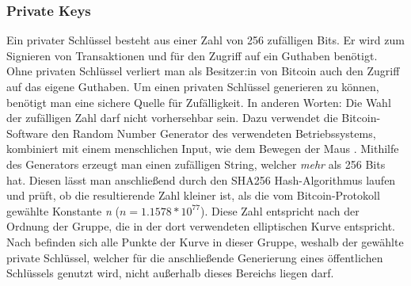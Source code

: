 \subsubsection{Private Keys}
Ein privater Schlüssel besteht aus einer Zahl von 256 zufälligen Bits. Er wird zum Signieren von Transaktionen und für den Zugriff auf ein Guthaben benötigt. Ohne privaten Schlüssel verliert man als Besitzer:in von Bitcoin auch den Zugriff auf das eigene Guthaben.
Um einen privaten Schlüssel generieren zu können, benötigt man eine sichere Quelle für Zufälligkeit. In anderen Worten: Die Wahl der zufälligen Zahl darf nicht vorhersehbar sein. Dazu verwendet die Bitcoin-Software den Random Number Generator des verwendeten Betriebssystems, kombiniert mit einem menschlichen Input, wie dem Bewegen der Maus \cite[S. 58]{antanopoulos_2014}. Mithilfe des Generators erzeugt man einen zufälligen String, welcher \emph{mehr} als 256 Bits hat. Diesen lässt man anschließend durch den SHA256 Hash-Algorithmus laufen und prüft, ob die resultierende Zahl kleiner ist, als die vom Bitcoin-Protokoll gewählte Konstante \emph{n} ($n = 1.1578 * 10^{77}$). Diese Zahl entspricht nach \cite{corbellini_2015} der Ordnung der Gruppe, die in der dort verwendeten elliptischen Kurve entspricht. Nach \cite{corbellini_2015} befinden sich alle Punkte der Kurve in dieser Gruppe, weshalb der gewählte private Schlüssel, welcher für die anschließende Generierung eines öffentlichen Schlüssels genutzt wird, nicht außerhalb dieses Bereichs liegen darf.

